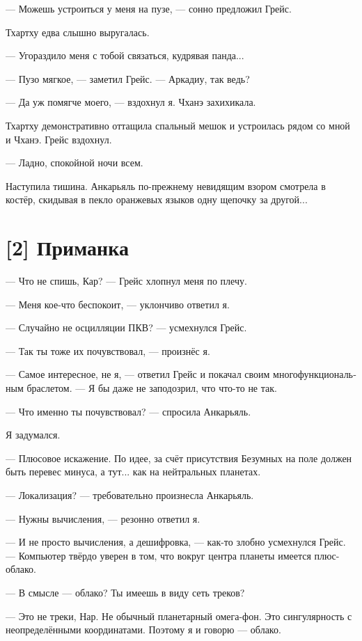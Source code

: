 \documentclass[a4paper,12pt,fleqn]{book}\usepackage{polyglossia}\setdefaultlanguage[babelshorthands=true]{russian}\setotherlanguage{english}\defaultfontfeatures{Ligatures=TeX,Mapping=tex-text}\usepackage{xcolor}\newcommand{\ml}[3]{#2}
\begin{document}
{--- Можешь устроиться у меня на пузе, --- сонно предложил Грейс.

Тхартху едва слышно выругалась.

--- Угораздило меня с тобой связаться, кудрявая панда...

--- Пузо мягкое, --- заметил Грейс.
--- Аркадиу, так ведь?

--- Да уж помягче моего, --- вздохнул я.
Чханэ захихикала.

Тхартху демонстративно оттащила спальный мешок и устроилась рядом со мной и Чханэ.
Грейс вздохнул.

--- Ладно, спокойной ночи всем.

Наступила тишина.
Анкарьяль по-прежнему невидящим взором смотрела в костёр, скидывая в пекло оранжевых языков одну щепочку за другой...

\section{[2] Приманка}

--- Что не спишь, Кар? --- Грейс хлопнул меня по плечу.

--- Меня кое-что беспокоит, --- уклончиво ответил я.

--- Случайно не осцилляции ПКВ? --- усмехнулся Грейс.

--- Так ты тоже их почувствовал, --- произнёс я.

--- Самое интересное, не я, --- ответил Грейс и покачал своим многофункциональным браслетом.
--- Я бы даже не заподозрил, что что-то не так.

--- Что именно ты почувствовал? --- спросила Анкарьяль.

Я задумался.

--- Плюсовое искажение.
По идее, за счёт присутствия Безумных на поле должен быть перевес минуса, а тут... как на нейтральных планетах.

--- Локализация? --- требовательно произнесла Анкарьяль.

--- Нужны вычисления, --- резонно ответил я.

--- И не просто вычисления, а дешифровка, --- как-то злобно усмехнулся Грейс.
--- Компьютер твёрдо уверен в том, что вокруг центра планеты имеется плюс-облако.

--- В смысле --- облако?
Ты имеешь в виду сеть треков?

--- Это не треки, Нар.
Не обычный планетарный омега-фон.
Это сингулярность с неопределёнными координатами.
Поэтому я и говорю --- облако.

}
\end{document}
